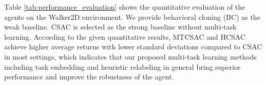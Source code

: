 

Table \ref{tab:performance_evaluation} shows the quantitative evaluation of the agents on the Walker2D environment. We provide behavioral cloning (BC) as the weak baseline. CSAC is selected as the strong baseline without multi-task learning. According to the given quantitative results, MTCSAC and HCSAC achieve higher average returns with lower standard deviations compared to CSAC in most settings, which indicates that our proposed multi-task learning methods including task embedding and heuristic relabeling in general bring superior performance and improve the robustness of the agent.